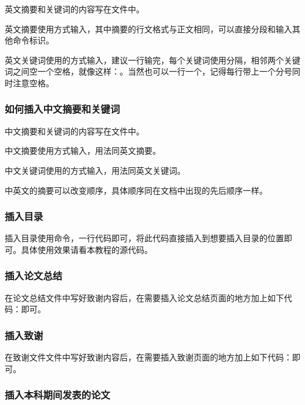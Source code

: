 \documentclass{nitthesis}
\begin{document}
英文摘要和关键词的内容写在文件中。

英文摘要使用方式输入，其中摘要的行文格式与正文相同，可以直接分段和输入其他命令标识。

英文关键词使用的方式输入，建议一行输完，每个关键词使用\Code{;}分隔，相邻两个关键词之间空一个空格，就像这样：。当然也可以一行一个，记得每行带上一个分号同时注意空格。

\subsubsection{如何插入中文摘要和关键词}

中文摘要和关键词的内容写在文件中。

中文摘要使用方式输入，用法同英文摘要。

中文关键词使用的方式输入，用法同英文关键词。

中英文的摘要可以改变顺序，具体顺序同在文档中出现的先后顺序一样。

\subsubsection{插入目录}

插入目录使用命令，一行代码即可，将此代码直接插入到想要插入目录的位置即可。具体使用效果请看本教程的源代码。

\subsubsection{插入论文总结}

在论文总结文件中写好致谢内容后，在需要插入论文总结页面的地方加上如下代码：即可。

\subsubsection{插入致谢}

在致谢文件文件中写好致谢内容后，在需要插入致谢页面的地方加上如下代码：即可。

\subsubsection{插入本科期间发表的论文}
\end{document}

